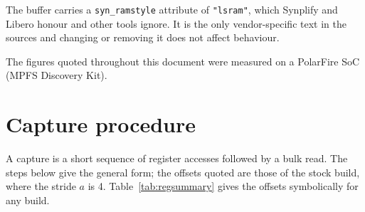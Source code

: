 \documentclass[twocolumn]{article}
\begin{document}
The buffer carries a \texttt{syn\_ramstyle} attribute of \texttt{"lsram"}, which Synplify and Libero honour and other tools ignore. It is the only vendor-specific text in the sources and changing or removing it does not affect behaviour.

The figures quoted throughout this document were measured on a PolarFire SoC (MPFS Discovery Kit).

\newpage
\section{Capture procedure}
\label{sec:capture}
A capture is a short sequence of register accesses followed by a bulk read. The steps below give the general form; the offsets quoted are those of the stock build, where the stride $a$ is 4. Table~\ref{tab:regsummary} gives the offsets symbolically for any build.
\end{document}
